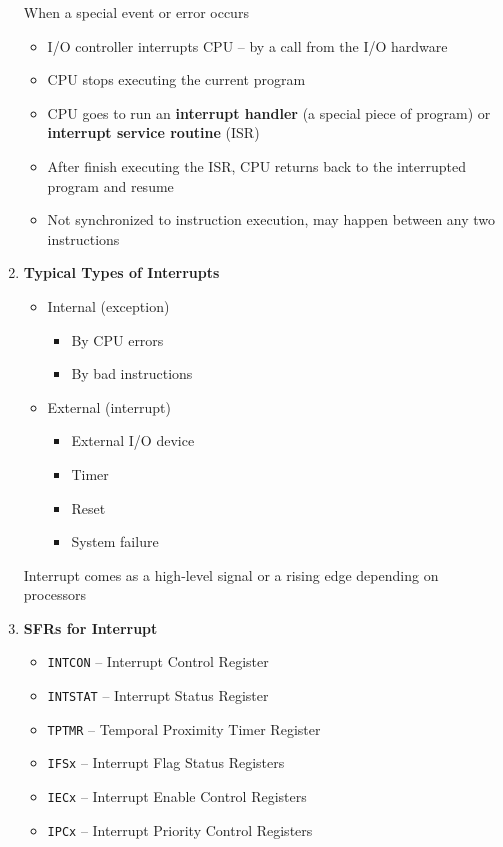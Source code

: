 \documentclass[a4paper]{article}
\begin{document}
\begin{enumerate}[label = \arabic*.]
      \par When a special event or error occurs
      \begin{itemize}[leftmargin = 1cm]
        \item I/O controller interrupts CPU -- by a call from the I/O hardware
        \item CPU stops executing the current program
        \item CPU goes to run an \textbf{interrupt handler} (a special piece of program) or \textbf{interrupt service routine} (ISR)
        \item After finish executing the ISR, CPU returns back to the interrupted program and resume
        \item Not synchronized to instruction execution, may happen between any two instructions
      \end{itemize}
    \item \textbf{Typical Types of Interrupts}
      \begin{itemize}[leftmargin = 1cm]
        \item Internal (exception)
          \begin{itemize}[leftmargin = 1cm]
            \item By CPU errors
            \item By bad instructions
          \end{itemize}
        \item External (interrupt)
          \begin{itemize}[leftmargin = 1cm]
            \item External I/O device
            \item Timer
            \item Reset
            \item System failure
          \end{itemize}
      \end{itemize}
      \par Interrupt comes as a high-level signal or a rising edge depending on processors

    \item \textbf{SFRs for Interrupt}
      \begin{itemize}[leftmargin = 1cm]
        \item \verb|INTCON| -- Interrupt Control Register
        \item \verb|INTSTAT| -- Interrupt Status Register
        \item \verb|TPTMR| -- Temporal Proximity Timer Register
        \item \verb|IFSx| -- Interrupt Flag Status Registers
        \item \verb|IECx| -- Interrupt Enable Control Registers
        \item \verb|IPCx| -- Interrupt Priority Control Registers
      \end{itemize}


\end{enumerate}
\end{document}
